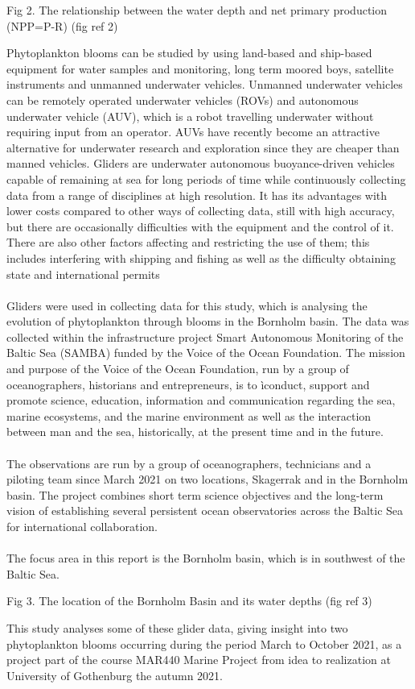 \documentclass[../Main.tex]{subfiles}
\begin{document}
Fig 2. The relationship between the water depth and net primary production (NPP=P-R) (fig ref 2)

Phytoplankton blooms can be studied by using land-based and ship-based equipment for water samples and monitoring, long term moored boys, satellite instruments and unmanned underwater vehicles.\supercite{}
Unmanned underwater vehicles can be remotely operated underwater vehicles (ROVs) and autonomous underwater vehicle (AUV), 
which is a robot travelling underwater without requiring input from an operator. 
AUVs have recently become an attractive alternative for underwater research and exploration since they are cheaper than manned vehicles. 
Gliders are underwater autonomous buoyance-driven vehicles capable of remaining at sea for long periods of time while continuously collecting data from a range of disciplines at high resolution. 
It has its advantages with lower costs compared to other ways of collecting data, still with high accuracy, but there are occasionally difficulties with the equipment and the control of it. 
There are also other factors affecting and restricting the use of them; this includes interfering with shipping and fishing as well as the difficulty obtaining state and international permits
\\
\\
Gliders were used in collecting data for this study, which is analysing the evolution of phytoplankton through blooms in the Bornholm basin. 
The data was collected within the infrastructure project Smart Autonomous Monitoring of the Baltic Sea (SAMBA) funded by the Voice of the Ocean Foundation. 
The mission and purpose of the Voice of the Ocean Foundation, run by a group of oceanographers, historians and entrepreneurs, is to ìconduct, 
support and promote science, education, information and communication regarding the sea, marine ecosystems, 
and the marine environment as well as the interaction between man and the sea, historically, at the present time and in the future.\supercite{}
\\
\\
The observations are run by a group of oceanographers, technicians and a piloting team since March 2021 on two locations, Skagerrak and in the Bornholm basin. 
The project combines short term science objectives and the long-term vision of establishing several persistent ocean observatories across the Baltic Sea for international collaboration.\supercite{}
\\
\\
The focus area in this report is the Bornholm basin, which is in southwest of the Baltic Sea. 

Fig 3. The location of the Bornholm Basin and its water depths (fig ref 3)

This study analyses some of these glider data, giving insight into two phytoplankton blooms occurring during the period March to October 2021, 
as a project part of the course MAR440 Marine Project from idea to realization at University of Gothenburg the autumn 2021.
\end{document}

